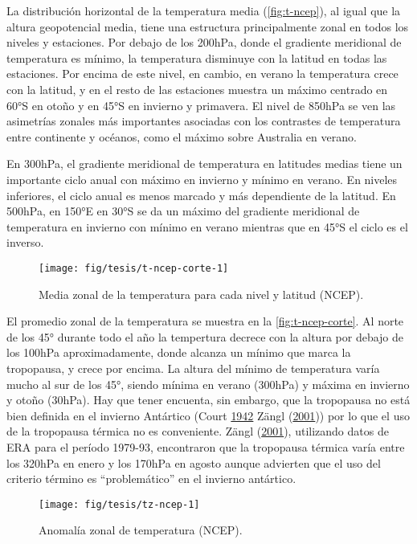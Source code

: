 \documentclass[spanish,a4paper,12p]{book}
\begin{document}
La distribución horizontal de la temperatura media
(\autoref{fig:t-ncep}), al igual que la altura geopotencial media, tiene
una estructura principalmente zonal en todos los niveles y estaciones.
Por debajo de los 200hPa, donde el gradiente meridional de temperatura
es mínimo, la temperatura disminuye con la latitud en todas las
estaciones. Por encima de este nivel, en cambio, en verano la
temperatura crece con la latitud, y en el resto de las estaciones
muestra un máximo centrado en 60°S en otoño y en 45°S en invierno y
primavera. El nivel de 850hPa se ven las asimetrías zonales más
importantes asociadas con los contrastes de temperatura entre continente
y océanos, como el máximo sobre Australia en verano.

En 300hPa, el gradiente meridional de temperatura en latitudes medias
tiene un importante ciclo anual con máximo en invierno y mínimo en
verano. En niveles inferiores, el ciclo anual es menos marcado y más
dependiente de la latitud. En 500hPa, en 150°E en 30°S se da un máximo
del gradiente meridional de temperatura en invierno con mínimo en verano
mientras que en 45°S el ciclo es el inverso.

\begin{figure*}
\texttt{[image: fig/tesis/t-ncep-corte-1]} \caption{Media zonal de la temperatura para cada nivel y latitud (NCEP).}\label{fig:t-ncep-corte}
\end{figure*}

El promedio zonal de la temperatura se muestra en la
\autoref{fig:t-ncep-corte}. Al norte de los 45° durante todo el año la
tempertura decrece con la altura por debajo de los 100hPa
aproximadamente, donde alcanza un mínimo que marca la tropopausa, y
crece por encima. La altura del mínimo de temperatura varía mucho al sur
de los 45°, siendo mínima en verano (300hPa) y máxima en invierno y
otoño (30hPa). Hay que tener encuenta, sin embargo, que la tropopausa no
está bien definida en el invierno Antártico (Court
\protect\hyperlink{ref-Court1942}{1942} Zängl
(\protect\hyperlink{ref-Zangl2001}{2001})) por lo que el uso de la
tropopausa térmica no es conveniente. Zängl
(\protect\hyperlink{ref-Zangl2001}{2001}), utilizando datos de ERA para
el período 1979-93, encontraron que la tropopausa térmica varía entre
los 320hPa en enero y los 170hPa en agosto aunque advierten que el uso
del criterio término es ``problemático'' en el invierno antártico.

\begin{landscape}\begin{figure}

{\centering \texttt{[image: fig/tesis/tz-ncep-1]} 

}

\caption{Anomalía zonal de temperatura (NCEP).}\label{fig:tz-ncep}
\end{figure}
\end{landscape}
\end{document}
